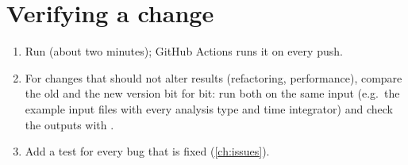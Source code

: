 \section{Verifying a change}

\begin{enumerate}
  \item Run  (about two minutes); GitHub Actions runs it on every
    push.
  \item For changes that should not alter results (refactoring, performance),
    compare the old and the new version bit for bit: run both on the same input
    (e.g.\ the example input files with every analysis type and time integrator)
    and check the outputs with .
  \item Add a test for every bug that is fixed (\cref{ch:issues}).
\end{enumerate}
